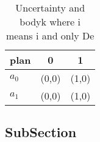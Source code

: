 \documentclass[a4paper]{article}
\begin{document}
\begin{table}
\begin{adjustbox}{width=1\columnwidth}
\begin{tabular}{|l|l|l|}
\hline
\textbf{plan} & \multicolumn{1}{c|}{\textbf{0}} & \multicolumn{1}{c|}{\textbf{1}} \\ \hline
\textbf{$a_0$}  & (0,0) & (1,0) \\ \hline
\textbf{$a_1$}  & (0,0) & (1,0) \\ \hline
\end{tabular}
\end{adjustbox}
\caption{Uncertainty and bodyk where i means i and only De
}
\end{table}

\subsection{SubSection}
\end{document}
